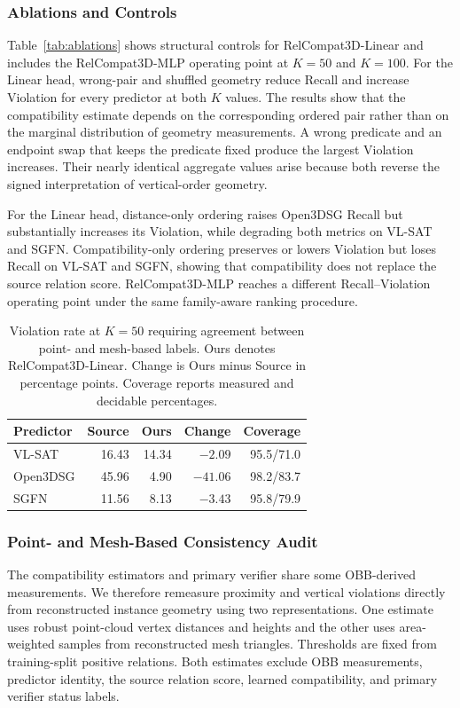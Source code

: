 \subsubsection{Ablations and Controls}
Table~\ref{tab:ablations} shows structural controls for RelCompat3D-Linear and includes the RelCompat3D-MLP operating point at $K=50$ and $K=100$. For the Linear head, wrong-pair and shuffled geometry reduce Recall and increase Violation for every predictor at both $K$ values. The results show that the compatibility estimate depends on the corresponding ordered pair rather than on the marginal distribution of geometry measurements. A wrong predicate and an endpoint swap that keeps the predicate fixed produce the largest Violation increases. Their nearly identical aggregate values arise because both reverse the signed interpretation of vertical-order geometry. 

For the Linear head, distance-only ordering raises Open3DSG Recall but substantially increases its Violation, while degrading both metrics on VL-SAT and SGFN. Compatibility-only ordering preserves or lowers Violation but loses Recall on VL-SAT and SGFN, showing that compatibility does not replace the source relation score. RelCompat3D-MLP reaches a different Recall--Violation operating point under the same family-aware ranking procedure. 

\begin{table}[t]
    \centering
    {\small
    \setlength{\tabcolsep}{1.5pt}
    \begin{tabular}{@{}lrrrr@{}}
    \toprule
    Predictor & Source & Ours & Change & Coverage \\
    \midrule
    VL-SAT   & 16.43 & 14.34 & $-2.09$ & 95.5/71.0 \\
    Open3DSG & 45.96 & 4.90  & $-41.06$ & 98.2/83.7 \\
    SGFN     & 11.56 & 8.13  & $-3.43$ & 95.8/79.9 \\
    \bottomrule
    \end{tabular}
    }
    \caption{Violation rate at $K=50$ requiring agreement between point- and mesh-based labels. Ours denotes RelCompat3D-Linear. Change is Ours minus Source in percentage points. Coverage reports measured and decidable percentages.}
    \label{tab:surface-audit}
\end{table}

\subsubsection{Point- and Mesh-Based Consistency Audit}
The compatibility estimators and primary verifier share some OBB-derived measurements. We therefore remeasure proximity and vertical violations directly from reconstructed instance geometry using two representations. One estimate uses robust point-cloud vertex distances and heights and the other uses area-weighted samples from reconstructed mesh triangles. Thresholds are fixed from training-split positive relations. Both estimates exclude OBB measurements, predictor identity, the source relation score, learned compatibility, and primary verifier status labels.

